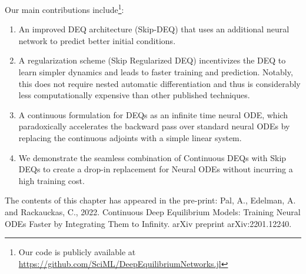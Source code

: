 Our main contributions include\footnote{Our code is publicly available at \url{https://github.com/SciML/DeepEquilibriumNetworks.jl}}:
%
\begin{enumerate}
    \item An improved DEQ architecture (Skip-DEQ) that uses an additional neural network to predict better initial conditions.

    \item A regularization scheme (Skip Regularized DEQ) incentivizes the DEQ to learn simpler dynamics and leads to faster training and prediction. Notably, this does not require nested automatic differentiation and thus is considerably less computationally expensive than other published techniques.

    \item A continuous formulation for DEQs as an infinite time neural ODE, which paradoxically accelerates the backward pass over standard neural ODEs by replacing the continuous adjoints with a simple linear system.

    \item We demonstrate the seamless combination of Continuous DEQs with Skip DEQs to create a drop-in replacement for Neural ODEs without incurring a high training cost.
\end{enumerate}
%

The contents of this chapter has appeared in the pre-print: Pal, A., Edelman, A. and Rackauckas, C., 2022. Continuous Deep Equilibrium Models: Training Neural ODEs Faster by Integrating Them to Infinity. arXiv preprint arXiv:2201.12240.~\citep{pal2022mixing}




